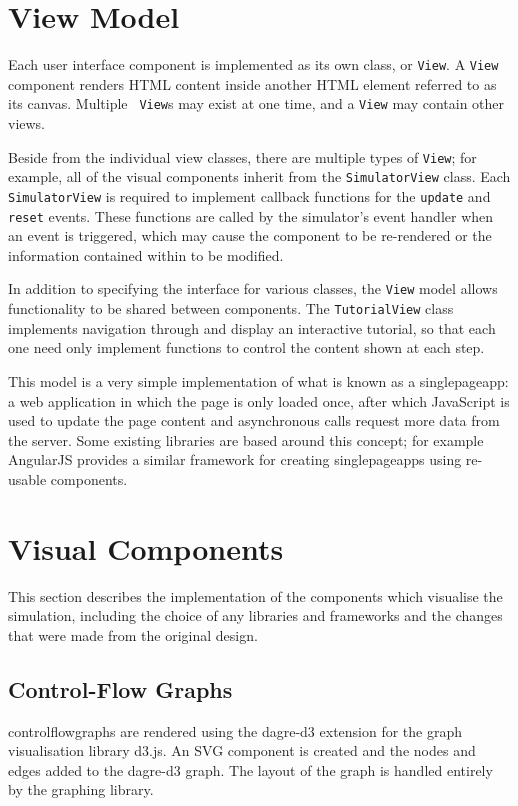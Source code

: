 \documentclass[bsc,twoside,singlespacing,parskip,logo,notimes,normalheadings]{infthesis}
\begin{document}
    \section{View Model}
    
    Each user interface component is implemented as its own class, or
    {\tt View}. A {\tt View} component renders HTML content inside
    another HTML element referred to as its canvas. Multiple {\tt
      View}s may exist at one time, and a {\tt View} may contain other
    views. 

    Beside from the individual view classes, there are multiple types
    of {\tt View}; for example, all of the visual components inherit
    from the {\tt SimulatorView} class. Each {\tt SimulatorView} is
    required to implement callback functions for the {\tt update} and
    {\tt reset} events.  These functions are called by the simulator's
    event handler when an event is triggered, which may cause the
    component to be re-rendered or the information contained within to
    be modified.
    
    In addition to specifying the interface for various classes, the
    {\tt View} model allows functionality to be shared between
    components. The {\tt TutorialView} class implements navigation
    through and display an interactive tutorial, so that each one need
    only implement functions to control the content shown at each
    step.

    This model is a very simple implementation of what is known as a
    \gls{singlepageapp}: a web application in which the page is only
    loaded once, after which JavaScript is used to update the page
    content and asynchronous calls request more data from the
    server. Some existing libraries are based around this concept; for
    example AngularJS\cite{angularjs} provides a similar framework for
    creating \gls{singlepageapp}s using re-usable components.
    
    \section{Visual Components}
    This section describes the implementation of the components which
    visualise the simulation, including the choice of any libraries
    and frameworks and the changes that were made from the original
    design.

        \subsection{Control-Flow Graphs}\label{sec:impl-visual-cfg}
        \Gls{controlflowgraph}s are rendered using the dagre-d3
        extension for the graph visualisation library d3.js. An SVG
        component is created and the nodes and edges added to the
        dagre-d3 graph. The layout of the graph is handled entirely by
        the graphing library.
\end{document}
